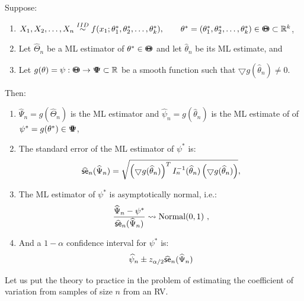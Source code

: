 \begin{prop}
Suppose:
\begin{enumerate}
\item $X_1,X_2,\ldots,X_n \overset{IID}{\sim} f(x_1;\theta_1^*,\theta_2^*,\ldots,\theta_k^*), \qquad \theta^*=(\theta_1^*,\theta_2^*,\ldots,\theta_k^*)\in {\Theta}\mspace{-11 mu}{\Theta}\subset \mathbb{R}^k$,
\item Let  $\widehat{\Theta}_n$ be a ML estimator of $\theta^* \in {\Theta}\mspace{-11 mu}{\Theta}$ and let $\widehat{\theta}_n$ be its ML estimate, and
\item Let $g(\theta)=\psi:{\Theta}\mspace{-11 mu}{\Theta} \to {\Psi}\mspace{-11 mu}{\Psi} \subset \mathbb{R}$ be a smooth function such that $\bigtriangledown g(\widehat{\theta}_n) \neq 0$.
\end{enumerate}
Then: 
\begin{enumerate}
\item $\widehat{\Psi}_n = g(\widehat{\Theta}_n)$ is the ML estimator and  $\widehat{\psi}_n = g(\widehat{\theta}_n)$ is the ML estimate of of $\psi^*=g(\theta^*) \in {\Psi}\mspace{-11 mu}{\Psi}$,
\item The standard error of the ML estimator of $\psi^*$ is:
$$\widehat{\sf{se}}_n(\widehat{\Psi}_n) = \sqrt{ \left( \bigtriangledown g(\widehat{\theta}_n) \right)^T I_n^{-1}(\widehat{\theta}_n) \left( \bigtriangledown g(\widehat{\theta}_n) \right)}, $$
\item The ML estimator of $\psi^*$ is asymptotically normal, i.e.:
$$\frac{\widehat{\Psi}_n - \psi^*}{\widehat{\sf{se}}_n(\widehat{\Psi}_n)} \rightsquigarrow \mbox{{\rm Normal}}(0,1) \  ,$$
\item And a $1-\alpha$ confidence interval for $\psi^*$ is:
\[
\widehat{\psi}_n \pm z_{\alpha/2} {\widehat{\sf{se}}_n(\widehat{\Psi}_n)} 
\]
\end{enumerate}
\end{prop}
Let us put the theory to practice in the problem of estimating the coefficient of variation from samples of size $n$ from an RV.
